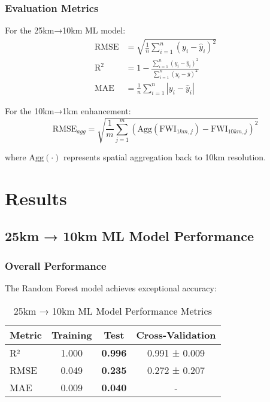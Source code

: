 \documentclass[11pt,a4paper]{article}
\begin{document}
\subsubsection{Evaluation Metrics}
For the 25km→10km ML model:
\begin{align}
    \text{RMSE} &= \sqrt{\frac{1}{n}\sum_{i=1}^{n}(y_i - \hat{y}_i)^2} \\
    \text{R}^2 &= 1 - \frac{\sum_{i=1}^{n}(y_i - \hat{y}_i)^2}{\sum_{i=1}^{n}(y_i - \bar{y})^2} \\
    \text{MAE} &= \frac{1}{n}\sum_{i=1}^{n}|y_i - \hat{y}_i|
\end{align}

For the 10km→1km enhancement:
\begin{equation}
    \text{RMSE}_{agg} = \sqrt{\frac{1}{m}\sum_{j=1}^{m}(\text{Agg}(\text{FWI}_{1km,j}) - \text{FWI}_{10km,j})^2}
\end{equation}

where $\text{Agg}(\cdot)$ represents spatial aggregation back to 10km resolution.

\section{Results}

\subsection{25km → 10km ML Model Performance}

\subsubsection{Overall Performance}
The Random Forest model achieves exceptional accuracy:

\begin{table}[H]
\centering
\caption{25km → 10km ML Model Performance Metrics}
\begin{tabular}{@{}lccc@{}}
\toprule
\textbf{Metric} & \textbf{Training} & \textbf{Test} & \textbf{Cross-Validation} \\
\midrule
R² & 1.000 & \textbf{0.996} & 0.991 ± 0.009 \\
RMSE & 0.049 & \textbf{0.235} & 0.272 ± 0.207 \\
MAE & 0.009 & \textbf{0.040} & - \\
\bottomrule
\end{tabular}
\label{tab:ml_performance}
\end{table}
\end{document}
